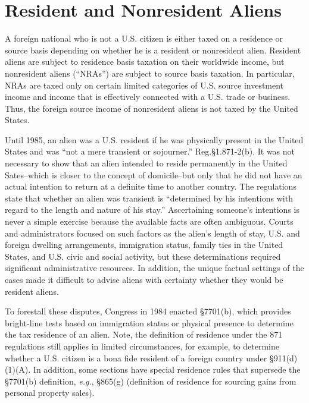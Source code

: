  
\section{Resident and Nonresident Aliens}

A foreign national who is not a U.S. citizen is either taxed on a residence or source basis depending on whether he is a resident or nonresident alien.  Resident aliens are subject to residence basis taxation on their worldwide income, but nonresident aliens (``NRAs'') are subject to source basis taxation.  In particular, NRAs are taxed only on certain limited categories of U.S. source investment income and income that is effectively connected with a U.S. trade or business.  Thus, the foreign source income of nonresident aliens is not taxed by the United States.  

Until 1985, an alien was a U.S. resident if he was physically present in the United States and was ``not a mere transient or sojourner.''  Reg.\@ \S1.871-2(b).  It was not necessary to show that an alien intended to reside permanently in the United Sates--which is closer to the concept of domicile--but only that he did not have an actual intention to return at a definite time to another country.  The regulations state that whether an alien was transient is ``determined by his intentions with regard to the length and nature of his stay.''  Ascertaining someone's intentions is never a simple exercise because the available facts are often ambiguous.  Courts and administrators focused on such factors as the alien's length of stay, U.S. and foreign dwelling arrangements, immigration status, family ties in the United States, and U.S. civic and social activity, but these determinations required significant administrative resources.  In addition, the unique factual settings of the cases made it difficult to advise aliens with certainty whether they would be resident aliens. 

To forestall these disputes, Congress in 1984 enacted \S7701(b), which provides bright-line tests based on immigration status or physical presence to determine the tax residence of an alien.  Note, the definition of residence under the 871 regulations still applies in limited circumstances, for example, to determine whether a U.S. citizen is a bona fide resident of a foreign country under \S 911(d)(1)(A).  In addition, some sections have special residence rules that supersede the \S 7701(b) definition, \emph{e.g.}, \S 865(g) (definition of residence for sourcing gains from personal property sales).


